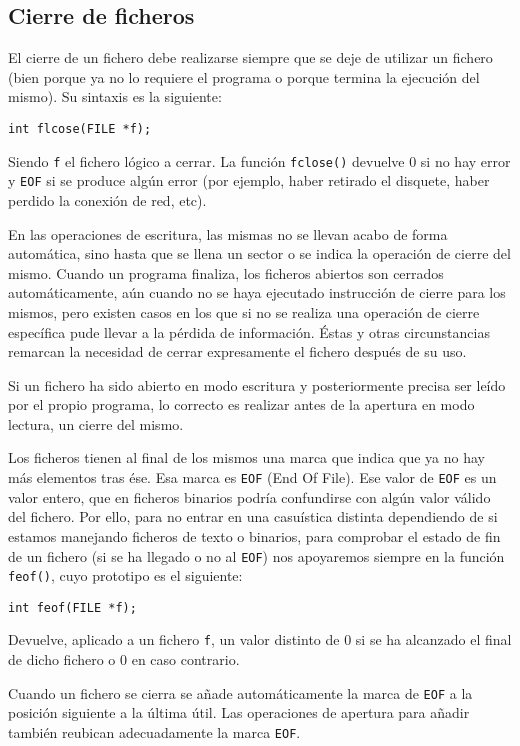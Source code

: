 \subsection{Cierre de ficheros}{
El cierre de un fichero debe realizarse siempre que se deje de utilizar un fichero (bien porque ya no lo requiere el programa o porque termina la ejecución del mismo). Su sintaxis es la siguiente:

\texttt{int flcose(FILE *f);}

Siendo \texttt{f} el fichero lógico a cerrar. La función \texttt{fclose()} devuelve 0 si no hay error y \texttt{EOF} si se produce algún error (por ejemplo, haber retirado el disquete, haber perdido la conexión de red, etc).

En las operaciones de escritura, las mismas no se llevan acabo de forma automática, sino hasta que se llena un sector o se indica la operación de cierre del mismo. Cuando un programa finaliza, los ficheros abiertos son cerrados automáticamente, aún cuando no se haya ejecutado instrucción de cierre para los mismos, pero existen casos en los que si no se realiza una operación de cierre específica pude llevar a la pérdida de información. Éstas y otras circunstancias remarcan la necesidad de cerrar expresamente el fichero después de su uso.

Si un fichero ha sido abierto en modo escritura y posteriormente precisa ser leído por el propio programa, lo correcto es realizar antes de la apertura en modo lectura, un cierre del mismo.

Los ficheros tienen al final de los mismos una marca que indica que ya no hay más elementos tras ése. Esa marca es \texttt{EOF} (End Of File). Ese valor de \texttt{EOF} es un valor entero, que en ficheros binarios podría confundirse con algún valor válido del fichero. Por ello, para no entrar en una casuística distinta dependiendo de si estamos manejando ficheros de texto o binarios, para comprobar el estado de fin de un fichero (si se ha llegado o no al \texttt{EOF}) nos apoyaremos siempre en la función \texttt{feof()}, cuyo prototipo es el siguiente:

\texttt{int feof(FILE *f);}

Devuelve, aplicado a un fichero \texttt{f}, un valor distinto de 0 si se ha alcanzado el final de dicho fichero o 0 en caso contrario.

Cuando un fichero se cierra se añade automáticamente la marca de \texttt{EOF} a la posición siguiente a la última útil. Las operaciones de apertura para añadir también reubican adecuadamente la marca \texttt{EOF}.
}
